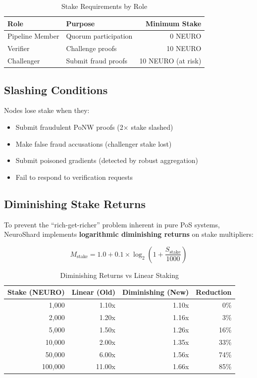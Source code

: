 \documentclass[11pt,a4paper]{article}
\begin{document}
\begin{table}[H]
\centering
\caption{Stake Requirements by Role}
\begin{tabular}{@{}llr@{}}
\toprule
\textbf{Role} & \textbf{Purpose} & \textbf{Minimum Stake} \\
\midrule
Pipeline Member & Quorum participation & 0 NEURO \\
Verifier & Challenge proofs & 10 NEURO \\
Challenger & Submit fraud proofs & 10 NEURO (at risk) \\
\bottomrule
\end{tabular}
\end{table}

\subsection{Slashing Conditions}

Nodes lose stake when they:
\begin{itemize}
    \item Submit fraudulent PoNW proofs (2$\times$ stake slashed)
    \item Make false fraud accusations (challenger stake lost)
    \item Submit poisoned gradients (detected by robust aggregation)
    \item Fail to respond to verification requests
\end{itemize}

\subsection{Diminishing Stake Returns}
\label{sec:diminishing-returns}

To prevent the ``rich-get-richer'' problem inherent in pure PoS systems, NeuroShard implements \textbf{logarithmic diminishing returns} on stake multipliers:

\begin{equation}
M_{\text{stake}} = 1.0 + 0.1 \times \log_2\left(1 + \frac{S_{\text{stake}}}{1000}\right)
\end{equation}

\begin{table}[H]
\centering
\caption{Diminishing Returns vs Linear Staking}
\begin{tabular}{@{}rrrr@{}}
\toprule
\textbf{Stake (NEURO)} & \textbf{Linear (Old)} & \textbf{Diminishing (New)} & \textbf{Reduction} \\
\midrule
1,000 & 1.10x & 1.10x & 0\% \\
2,000 & 1.20x & 1.16x & 3\% \\
5,000 & 1.50x & 1.26x & 16\% \\
10,000 & 2.00x & 1.35x & 33\% \\
50,000 & 6.00x & 1.56x & 74\% \\
100,000 & 11.00x & 1.66x & 85\% \\
\bottomrule
\end{tabular}
\end{table}
\end{document}
